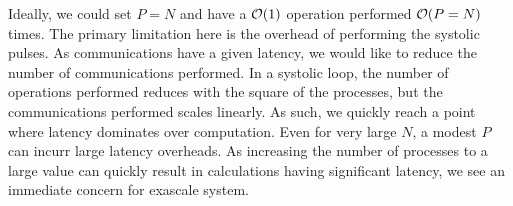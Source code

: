 Ideally, we could set $P = N$ and have a $\mathcal{O}{(1)}$ operation performed
$\mathcal{O}{(P = N)}$ times.
%
The primary limitation here is the overhead of performing the systolic
pulses.
%
As communications have a given latency, we would like to reduce the number
of communications performed.
%
In a systolic loop, the number of operations performed reduces with
the square of the processes, but the communications performed scales linearly.
%
As such, we quickly reach a point where latency dominates over computation.
%
Even for very large $N$, a modest $P$ can incurr large latency overheads.
%
As increasing the number of processes to a large value
can quickly result in calculations having significant latency,
we see an immediate concern for exascale system.
